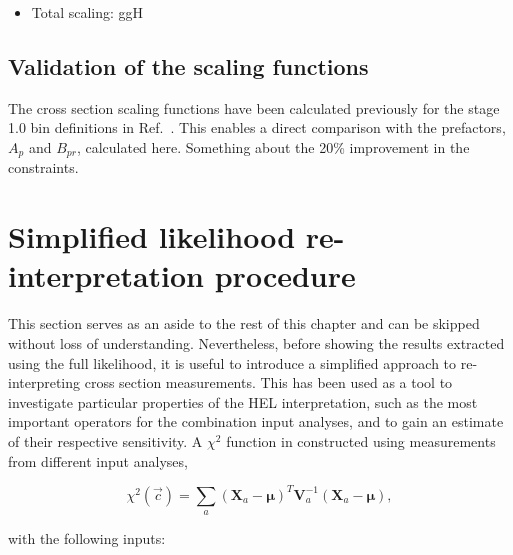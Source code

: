 \begin{itemize}
    \item Total scaling: ggH \Hgg
\end{itemize}

\subsection{Validation of the scaling functions}
The cross section scaling functions have been calculated previously for the stage 1.0 bin definitions in Ref.~\cite{Hays:2673969}. This enables a direct comparison with the prefactors, $A_p$ and $B_{pr}$, calculated here. 
Something about the 20\% improvement in the constraints.

\section{Simplified likelihood re-interpretation procedure}\label{sec:eft_simplified}
This section serves as an aside to the rest of this chapter and can be skipped without loss of understanding. Nevertheless, before showing the results extracted using the full likelihood, it is useful to introduce a simplified approach to re-interpreting cross section measurements. This has been used as a tool to investigate particular properties of the HEL interpretation, such as the most important operators for the combination input analyses, and to gain an estimate of their respective sensitivity. A $\chi^2$ function in constructed using measurements from different input analyses,

\begin{equation}
    \chi^2(\vec{c}) = \sum_a (\mathbf{X}_a-\pmb{\mu})^T \mathbf{V}_a^{-1} (\mathbf{X}_a-\pmb{\mu}),
\end{equation}

\noindent
with the following inputs:

